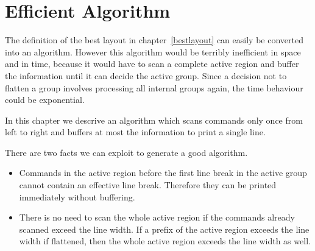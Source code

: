 \documentclass[12pt]{article}
\begin{document}
\section{Efficient Algorithm}

The definition of the best layout in chapter~\ref{bestlayout} can easily be
converted into an algorithm. However this algorithm would be terribly
inefficient in space and in time, because it would have to scan a complete
active region and buffer the information until it can decide the active
group. Since a decision not to flatten a group involves processing all
internal groups again, the time behaviour could be exponential.

In this chapter we descrive an algorithm which scans commands only once from
left to right and buffers at most the information to print a single
line.

There are two facts we can exploit to generate a good algorithm.
\begin{itemize}
\item Commands in the active region before the first line break in the active
  group cannot contain an effective line break. Therefore they can be printed
  immediately without buffering.

\item There is no need to scan the whole active region if the commands already
  scanned exceed the line width. If a prefix of the active region exceeds the
  line width if flattened, then the whole active region exceeds the line width
  as well.
\end{itemize}
\end{document}
